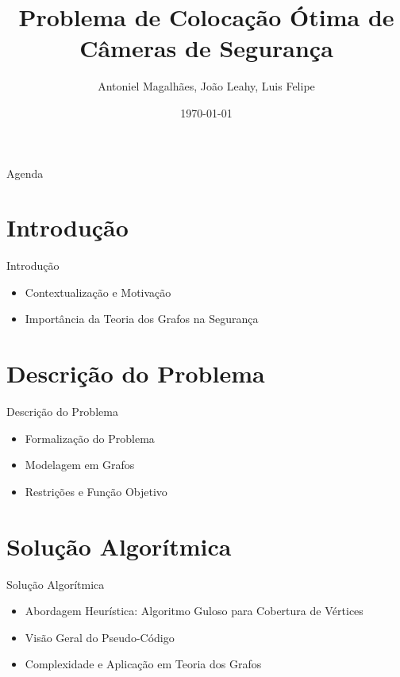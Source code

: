 \documentclass[aspectratio=169,xcolor=table]{beamer}
\author{Antoniel Magalhães, João Leahy, Luis Felipe}
\title{Problema de Colocação Ótima de Câmeras de Segurança}
\institute{Universidade Federal da Bahia}
\date{\today}
\begin{document}
\begin{frame}
    \titlepage
\end{frame}

\begin{frame}{Agenda}
    \tableofcontents
\end{frame}

\section{Introdução}

\begin{frame}{Introdução}
    \begin{itemize}
        \item Contextualização e Motivação
        \item Importância da Teoria dos Grafos na Segurança
    \end{itemize}
\end{frame}

\section{Descrição do Problema}

\begin{frame}{Descrição do Problema}
    \begin{itemize}
        \item Formalização do Problema
        \item Modelagem em Grafos
        \item Restrições e Função Objetivo
    \end{itemize}
\end{frame}

\section{Solução Algorítmica}

\begin{frame}{Solução Algorítmica}
    \begin{itemize}
        \item Abordagem Heurística: Algoritmo Guloso para Cobertura de Vértices
        \item Visão Geral do Pseudo-Código
        \item Complexidade e Aplicação em Teoria dos Grafos
    \end{itemize}
\end{frame}
\end{document}
